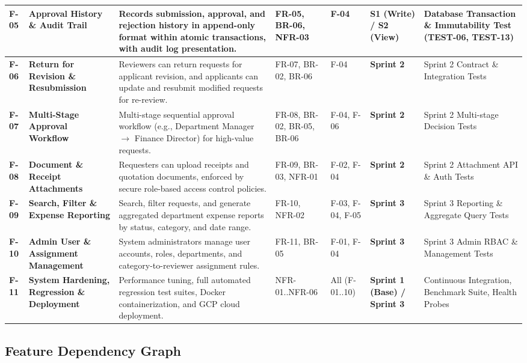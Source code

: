 \documentclass[11pt,a4paper]{article}
\begin{document}
\begin{longtable}{|>{\RaggedRight}p{1.1cm}|>{\RaggedRight}p{2.2cm}|>{\RaggedRight}p{3.4cm}|>{\RaggedRight}p{1.6cm}|>{\RaggedRight}p{1.2cm}|>{\centering\arraybackslash}p{1.6cm}|>{\RaggedRight}p{2.8cm}|}
\textbf{F-05} & \textbf{Approval History \& Audit Trail} & Records submission, approval, and rejection history in append-only format within atomic transactions, with audit log presentation. & FR-05, BR-06, NFR-03 & F-04 & \textbf{S1 (Write) / S2 (View)} & Database Transaction \& Immutability Test (TEST-06, TEST-13) \\ \hline
\textbf{F-06} & \textbf{Return for Revision \& Resubmission} & Reviewers can return requests for applicant revision, and applicants can update and resubmit modified requests for re-review. & FR-07, BR-02, BR-06 & F-04 & \textbf{Sprint 2} & Sprint 2 Contract \& Integration Tests \\ \hline
\textbf{F-07} & \textbf{Multi-Stage Approval Workflow} & Multi-stage sequential approval workflow (e.g., Department Manager $\rightarrow$ Finance Director) for high-value requests. & FR-08, BR-02, BR-05, BR-06 & F-04, F-06 & \textbf{Sprint 2} & Sprint 2 Multi-stage Decision Tests \\ \hline
\textbf{F-08} & \textbf{Document \& Receipt Attachments} & Requesters can upload receipts and quotation documents, enforced by secure role-based access control policies. & FR-09, BR-03, NFR-01 & F-02, F-04 & \textbf{Sprint 2} & Sprint 2 Attachment API \& Auth Tests \\ \hline
\textbf{F-09} & \textbf{Search, Filter \& Expense Reporting} & Search, filter requests, and generate aggregated department expense reports by status, category, and date range. & FR-10, NFR-02 & F-03, F-04, F-05 & \textbf{Sprint 3} & Sprint 3 Reporting \& Aggregate Query Tests \\ \hline
\textbf{F-10} & \textbf{Admin User \& Assignment Management} & System administrators manage user accounts, roles, departments, and category-to-reviewer assignment rules. & FR-11, BR-05 & F-01, F-04 & \textbf{Sprint 3} & Sprint 3 Admin RBAC \& Management Tests \\ \hline
\textbf{F-11} & \textbf{System Hardening, Regression \& Deployment} & Performance tuning, full automated regression test suites, Docker containerization, and GCP cloud deployment. & NFR-01..NFR-06 & All (F-01..10) & \textbf{Sprint 1 (Base) / Sprint 3} & Continuous Integration, Benchmark Suite, Health Probes \\ \hline
\end{longtable}
\vspace{0.3em}
\normalsize


\subsection{Feature Dependency Graph}
\end{document}
